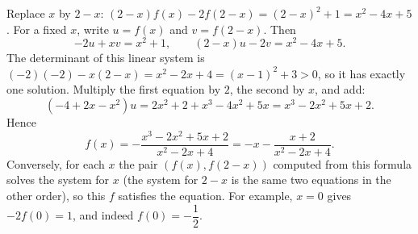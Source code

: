 Replace $x$ by $2-x$: $(2-x)f(x)-2f(2-x)=(2-x)^2+1=x^2-4x+5$. For a fixed $x$, write $u=f(x)$ and $v=f(2-x)$. Then
\[-2u+xv=x^2+1,\qquad(2-x)u-2v=x^2-4x+5.\]
The determinant of this linear system is $(-2)(-2)-x(2-x)=x^2-2x+4=(x-1)^2+3>0$, so it has exactly one solution. Multiply the first equation by $2$, the second by $x$, and add:
\[\left(-4+2x-x^2\right)u=2x^2+2+x^3-4x^2+5x=x^3-2x^2+5x+2.\]
Hence
\[f(x)=-\dfrac{x^3-2x^2+5x+2}{x^2-2x+4}=\boxed{-x-\dfrac{x+2}{x^2-2x+4}}.\]
Conversely, for each $x$ the pair $\left(f(x),f(2-x)\right)$ computed from this formula solves the system for $x$ (the system for $2-x$ is the same two equations in the other order), so this $f$ satisfies the equation. For example, $x=0$ gives $-2f(0)=1$, and indeed $f(0)=-\dfrac12$.
